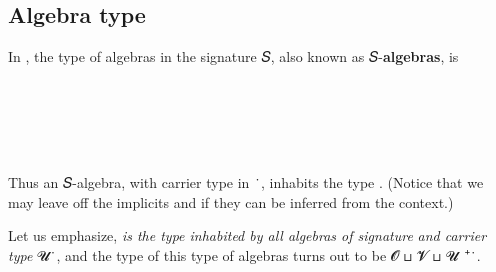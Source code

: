 \documentclass[a4paper,UKenglish,cleveref, autoref, thm-restate]{lipics-v2019}
\begin{document}
\subsection{Algebra type}
In \agdaualib, the type of algebras in the signature 𝑆, also known as 𝑆-\textbf{algebras}, is
\begin{code}%
\>[0]\AgdaSpace{}%
\AgdaSymbol{:}%
\>[98I]\AgdaSymbol{(}\AgdaSpace{}%
\AgdaSymbol{:}\AgdaSpace{}%
\AgdaSymbol{)\{}\AgdaSpace{}%
\AgdaSpace{}%
\AgdaSymbol{:}\AgdaSpace{}%
\AgdaSymbol{\}}\<%
\\
\>[.][@{}l@{}]\<[98I]%
\>[10]\AgdaSymbol{(}\AgdaSpace{}%
\AgdaSymbol{:}\AgdaSpace{}%
\AgdaSpace{}%
\AgdaSpace{}%
\AgdaSymbol{)}\AgdaSpace{}%
%
\>[33]\AgdaSpace{}%
\AgdaSpace{}%
\AgdaSpace{}%
\AgdaSpace{}%
\AgdaSpace{}%
\AgdaSpace{}%
\<%
\\
%
\\[\AgdaEmptyExtraSkip]%
\>[0]\AgdaSpace{}%
\AgdaSpace{}%
\AgdaSymbol{\{}\AgdaSymbol{\}\{}\AgdaSymbol{\}}\AgdaSpace{}%
\AgdaSpace{}%
\AgdaSymbol{=}\AgdaSpace{}\<%
\\
\>[.][@{}l@{}]\<[98I]%
\>[10]
\AgdaSpace{}%
\AgdaSpace{}%
\AgdaSpace{}%
\AgdaSpace{}%
\AgdaSpace{}%
\AgdaFunction{,}\AgdaSpace{}%
\AgdaSymbol{((}\AgdaSpace{}%
\AgdaSymbol{:}\AgdaSpace{}%
\AgdaSpace{}%
\AgdaSpace{}%
\AgdaSymbol{)}\AgdaSpace{}%
\AgdaSpace{}%
\AgdaSpace{}%
\AgdaSymbol{(}\AgdaSpace{}%
\AgdaSpace{}%
\AgdaSpace{}%
\AgdaSymbol{)}\AgdaSpace{}%
\AgdaSymbol{)}\<%
\end{code}
Thus an 𝑆-algebra, with carrier type in ~̇, inhabits the type \algebraUS.  (Notice that we may leave off the implicits  and  if they can be inferred from the context.)

Let us emphasize, \algebraUS \emph{is the type inhabited by all algebras of signature}  \emph{and carrier type} \ab 𝓤\ ̇, and the type of this type of algebras turns out to be \ab 𝓞 ⊔ \ab 𝓥 ⊔  \ab 𝓤\ ⁺\ ̇.
\end{document}
